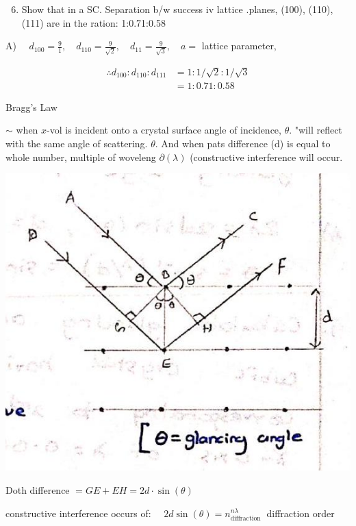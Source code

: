 \documentclass[10pt]{article}
\begin{document}
\begin{enumerate}
  \setcounter{enumi}{5}
  \item Show that in a SC. Separation b/w success iv lattice .planes, (100), (110), (111) are in the ration: 1:0.71:0.58
\end{enumerate}

A) $\quad d_{100}=\frac{9}{1}, \quad d_{110}=\frac{9}{\sqrt{2}}, \quad d_{11}=\frac{9}{\sqrt{3}}, \quad a=$ lattice parameter,

$$
\begin{aligned}
\therefore d_{100}: d_{110}: d_{111} & =1: 1 / \sqrt{2}: 1 / \sqrt{3} \\
& =1: 0.71: 0.58
\end{aligned}
$$

Bragg's Law

$\sim$ when $x$-vol is incident onto a crystal surface angle of incidence, $\theta$. "will reflect with the same angle of scattering. $\theta$. And when pats difference (d) is equal to whole number, multiple of woveleng $\partial(\lambda)$ (constructive interference will occur.

\begin{center}
\includegraphics[max width=\textwidth]{2024_06_16_30d750483617f1939202g-09}
\end{center}

Doth difference $=G E+E H=2 d \cdot \sin (\theta)$

constructive interference occurs of: $\quad 2 d \sin (\theta)=n_{\text {diffraction }}^{n \lambda}$ diffraction order
\end{document}
